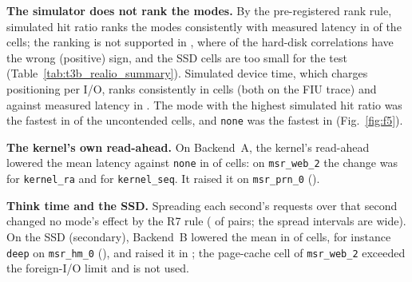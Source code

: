 \textbf{The simulator does not rank the modes.} By the pre-registered rank
rule, simulated hit ratio ranks the modes consistently with measured latency
in \decTallyRTwoHitRanksConsistentlyWithMeasuredLatency{} of the
\decTallyRTwoHit{} cells; the ranking is not supported in
\decTallyRTwoHitRankingNotSupported{}, where \decRhoPositiveHitSdb{} of the
\decRhoCellsHitSdb{} hard-disk correlations have the wrong (positive) sign, and
the SSD cells are too small for the test
(Table~\ref{tab:t3b_realio_summary}). Simulated device time, which charges
positioning per I/O, ranks consistently in
\decTallyRTwoDeviceTimeRanksConsistentlyWithMeasuredLatency{} cells (both on
the FIU trace) and against measured latency in
\decTallyRTwoDeviceTimeRanksAgainstMeasuredLatency. The mode with the highest
simulated hit ratio was the fastest in \decCellsTopSimFastest{} of the
\decCells{} uncontended cells, and \texttt{none} was the fastest in
\decCellsNoneFastest{} (Fig.~\ref{fig:f5}).

\textbf{The kernel's own read-ahead.} On Backend~A, the kernel's read-ahead
lowered the mean latency against \texttt{none} in
\decCountRSixSdbPagecacheClosedLowers{} of \decCountRSixSdbPagecacheClosed{}
cells: on \texttt{msr\_web\_2} the change was
\decRealioRSixSdbPagecacheClosedMsrWebTwoKernelRaCI{} for \texttt{kernel\_ra}
and \decRealioRSixSdbPagecacheClosedMsrWebTwoKernelSeqCI{} for
\texttt{kernel\_seq}. It raised it on
\texttt{msr\_prn\_0}
(\decRealioRSixSdbPagecacheClosedMsrPrnZeroKernelRaCI).

\textbf{Think time and the SSD.} Spreading each second's requests over that
second changed no mode's effect by the R7 rule
(\decTallyRSevenNoChangeByTheRSevenRule{} of \decTallyRSeven{} pairs; the spread
intervals are wide). On the SSD (secondary), Backend~B lowered the mean in
\decCountROneSsdOdirectClosedLowers{} of \decCountROneSsdOdirectClosed{} cells,
for instance \texttt{deep} on \texttt{msr\_hm\_0}
(\decRealioROneSsdOdirectClosedMsrHmZeroDeepCI), and raised it in
\decCountROneSsdOdirectClosedRaises; the page-cache cell of \texttt{msr\_web\_2}
exceeded the foreign-I/O limit and is not used.
